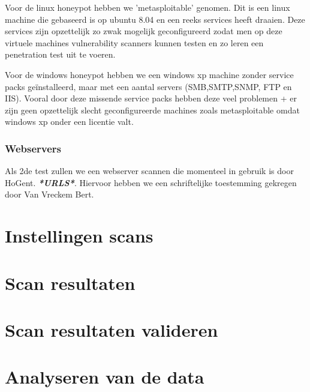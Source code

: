 Voor de linux honeypot hebben we 'metasploitable' genomen. Dit is een linux machine die gebaseerd is op ubuntu 8.04 en een reeks services heeft draaien. Deze services zijn opzettelijk zo zwak mogelijk geconfigureerd zodat men op deze virtuele machines vulnerability scanners kunnen testen en zo leren een penetration test uit te voeren.

Voor de windows honeypot hebben we een windows xp machine zonder service packs geïnstalleerd, maar met een aantal servers (SMB,SMTP,SNMP, FTP en IIS). Vooral door deze missende service packs hebben deze veel problemen + er zijn geen opzettelijk slecht geconfigureerde machines zoals metasploitable omdat windows xp onder een licentie valt. 

\subsubsection{Webservers}

Als 2de test zullen we een webserver scannen die momenteel in gebruik is door HoGent. \textit{\textbf{*URLS*}}. Hiervoor hebben we een schriftelijke toestemming gekregen door Van Vreckem Bert.

\section{Instellingen scans}

\section{Scan resultaten}

\section{Scan resultaten valideren}


\section{Analyseren van de data}

